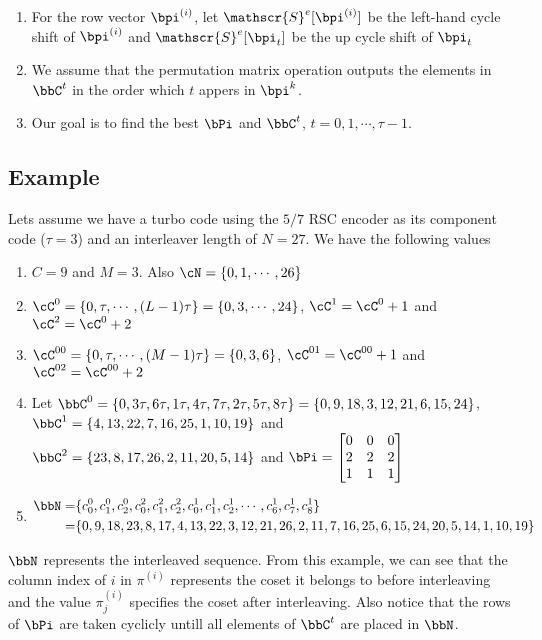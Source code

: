 \begin{enumerate}
\item For the row vector $\bpi^{(i)}$, let $\mathscr{S}^e[\bpi^{(i)}]$ be the left-hand cycle shift of $\bpi^{(i)}$ and $\mathscr{S}^e[\bpi_t]$ be the up cycle shift of $\bpi_t$
\item We assume that the permutation matrix operation outputs the elements in $\bbC^t$ in the order which $t$ appers in $\bpi^k$. 
\item Our goal is to find the best $\bPi$ and $\bbC^t$, $t = 0,1,\cdots,\tau-1$. 
\end{enumerate}

\subsection{Example}
Lets assume we have a turbo code using the $5/7$ RSC encoder as its component code ($\tau=3$) and an interleaver length of $N=27$. We have the following values
\begin{enumerate}
\item $C=9$ and $M=3$. Also $\cN=\{0,1,\cdots,26\}$

\item $\cC^0=\{0,\tau,\cdots,(L-1)\tau\} = \{0,3,\cdots,24\}$, $\cC^1=\cC^0+1$ and $\cC^2=\cC^0+2$

\item $\cC^{00}=\{0,\tau,\cdots,(M-1)\tau\} = \{0,3,6\}$, $\cC^{01}=\cC^{00}+1$ and $\cC^{02}=\cC^{00}+2$

\item Let $\bbC^0=\{0, 3\tau, 6\tau, 1\tau, 4\tau, 7\tau, 2\tau, 5\tau, 8\tau \} = \{0, 9, 18, 3,12, 21, 6, 15, 24 \} $, $\bbC^1=\{4, 13, 22, 7, 16, 25, 1, 10, 19 \}$ and $\bbC^2=\{ 23, 8, 17, 26, 2, 11, 20, 5, 14\} $ and $\bPi=\begin{bmatrix}0 & 0 & 0\cr2 & 2 & 2\cr1 & 1 & 1\end{bmatrix}$

\item \begin{equation}
\begin{split}
\bbN=&\{c^0_0,c^0_1,c_2^0 ,c^2_0,c^2_1,c_2^2 ,c^1_0,c^1_1,c^1_2,\cdots, c^1_6,c^1_7,c^1_8\}\\
 =& \{0,9,18, 23,8,17,4,13,22 ,3,12,21,26,2,11,7,16,25,6,15,24,20,5,14,1,10,19\}
 \end{split}
 \end{equation}

\end{enumerate}
$\bbN$ represents the interleaved sequence. From this example, we can see that the column index of $i$ in $\pi^{(i)}$ represents the coset it belongs to before interleaving and the value $\pi_{j}^{(i)}$ specifies the coset after interleaving. Also notice that the rows of $\bPi$ are taken cyclicly untill all elements of $\bbC^t$ are placed in $\bbN$.

